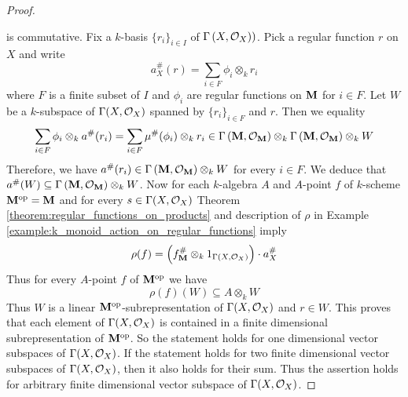 \begin{proof}
\begin{center}
\end{center}
is commutative. Fix a $k$-basis $\{r_i\}_{i\in I}$ of $\Gamma\left(X,{\mathcal O}_X)\right)$. Pick a regular function $r$ on $X$ and write
$$a^{\#}_X(r) = \sum_{i\in F}\phi_i\otimes_kr_i$$
where $F$ is a finite subset of $I$ and $\phi_i$ are regular functions on $\mathbf{M}$ for $i\in F$. Let $W$ be a $k$-subspace of $\Gamma(X,{\mathcal O}_X)$ spanned by $\{r_i\}_{i\in F}$ and $r$. Then we equality
$$\sum_{i\in F}\phi_i\otimes_ka^{\#}(r_i) = \sum_{i\in F}\mu^{\#}(\phi_i)\otimes_kr_i \in \Gamma\left(\mathbf{M},{\mathcal O}_{\mathbf{M}}\right)\otimes_k \Gamma\left(\mathbf{M},{\mathcal O}_{\mathbf{M}}\right) \otimes_k W$$
Therefore, we have $a^{\#}(r_i)\in \Gamma\left(\mathbf{M},{\mathcal O}_{\mathbf{M}}\right)\otimes_kW$ for every $i\in F$. We deduce that $a^{\#}(W) \subseteq \Gamma\left(\mathbf{M},{\mathcal O}_{\mathbf{M}}\right)\otimes_kW$. Now for each $k$-algebra $A$ and $A$-point $f$ of $k$-scheme $\mathbf{M}^{\mathrm{op}} = \mathbf{M}$ and for every $s\in \Gamma(X,{\mathcal O}_X)$ Theorem \ref{theorem:regular_functions_on_products} and description of $\rho$ in Example \ref{example:k_monoid_action_on_regular_functions} imply
$$\rho(f) =  \left(f^{\#}_{\mathbf{M}}\otimes_k 1_{\Gamma(X,{\mathcal O}_X)}\right)\cdot a^{\#}_X$$
Thus for every $A$-point $f$ of $\mathbf{M}^{\mathrm{op}}$ we have
$$\rho(f)\left(W\right) \subseteq A\otimes_kW$$
Thus $W$ is a linear $\mathbf{M}^{\mathrm{op}}$-subrepresentation of $\Gamma(X,{\mathcal O}_X)$ and $r\in W$. This proves that each element of $\Gamma(X,{\mathcal O}_X)$ is contained in a finite dimensional subrepresentation of $\mathbf{M}^{\mathrm{op}}$. So the statement holds for one dimensional vector subspaces of $\Gamma(X,{\mathcal O}_X)$. If the statement holds for two finite dimensional vector subspaces of $\Gamma(X,{\mathcal O}_X)$, then it also holds for their sum. Thus the assertion holds for arbitrary finite dimensional vector subspace of $\Gamma(X,{\mathcal O}_X)$.
\end{proof}


